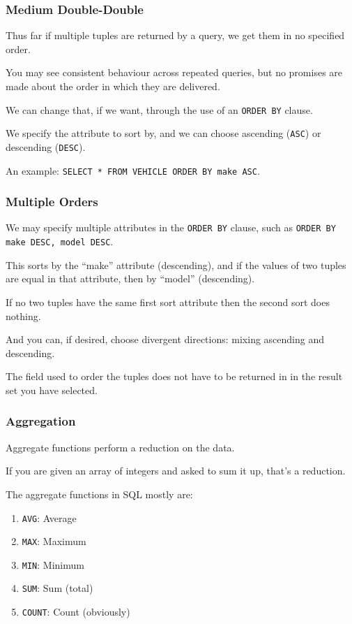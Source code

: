 \begin{frame}
\frametitle{Medium Double-Double}

Thus far if multiple tuples are returned by a query, we get them in no specified order. 

You may see consistent behaviour across repeated queries, but no promises are made about the order in which they are delivered. 

We can change that, if we want, through the use of an \texttt{ORDER BY} clause. 

We specify the attribute to sort by, and we can choose ascending (\texttt{ASC}) or descending (\texttt{DESC}). 

An example: \texttt{SELECT * FROM VEHICLE ORDER BY make ASC}.

\end{frame}



\begin{frame}
\frametitle{Multiple Orders}

We may specify multiple attributes in the \texttt{ORDER BY} clause, such as \texttt{ORDER BY make DESC, model DESC}. 

This sorts by the ``make'' attribute (descending), and if the values of two tuples are equal in that attribute, then by ``model'' (descending). 

If no two tuples have the same first sort attribute then the second sort does nothing.

And you can, if desired, choose divergent directions: mixing ascending and descending.

The field used to order the tuples does not have to be returned in in the result set you have selected.


\end{frame}



\begin{frame}
\frametitle{Aggregation}

Aggregate functions perform a reduction on the data. 

If you are given an array of integers and asked to sum it up, that's a reduction. 

The aggregate functions in SQL mostly are:
\begin{enumerate}
	\item \texttt{AVG}: Average 
	\item \texttt{MAX}: Maximum
	\item \texttt{MIN}: Minimum
	\item \texttt{SUM}: Sum (total)
	\item \texttt{COUNT}: Count (obviously)
\end{enumerate}


\end{frame}



